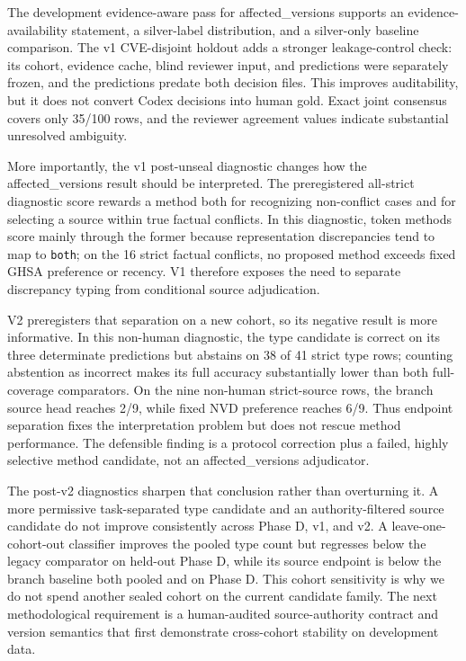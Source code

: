 The development evidence-aware pass for affected\_versions supports an evidence-availability statement, a silver-label distribution, and a silver-only baseline comparison. The v1 CVE-disjoint holdout adds a stronger leakage-control check: its cohort, evidence cache, blind reviewer input, and predictions were separately frozen, and the predictions predate both decision files. This improves auditability, but it does not convert Codex decisions into human gold. Exact joint consensus covers only 35/100 rows, and the reviewer agreement values indicate substantial unresolved ambiguity.

More importantly, the v1 post-unseal diagnostic changes how the affected\_versions result should be interpreted. The preregistered all-strict diagnostic score rewards a method both for recognizing non-conflict cases and for selecting a source within true factual conflicts. In this diagnostic, token methods score mainly through the former because representation discrepancies tend to map to \texttt{both}; on the 16 strict factual conflicts, no proposed method exceeds fixed GHSA preference or recency. V1 therefore exposes the need to separate discrepancy typing from conditional source adjudication.

V2 preregisters that separation on a new cohort, so its negative result is more informative. In this non-human diagnostic, the type candidate is correct on its three determinate predictions but abstains on 38 of 41 strict type rows; counting abstention as incorrect makes its full accuracy substantially lower than both full-coverage comparators. On the nine non-human strict-source rows, the branch source head reaches 2/9, while fixed NVD preference reaches 6/9. Thus endpoint separation fixes the interpretation problem but does not rescue method performance. The defensible finding is a protocol correction plus a failed, highly selective method candidate, not an affected\_versions adjudicator.

The post-v2 diagnostics sharpen that conclusion rather than overturning it. A more permissive task-separated type candidate and an authority-filtered source candidate do not improve consistently across Phase D, v1, and v2. A leave-one-cohort-out classifier improves the pooled type count but regresses below the legacy comparator on held-out Phase D, while its source endpoint is below the branch baseline both pooled and on Phase D. This cohort sensitivity is why we do not spend another sealed cohort on the current candidate family. The next methodological requirement is a human-audited source-authority contract and version semantics that first demonstrate cross-cohort stability on development data.

